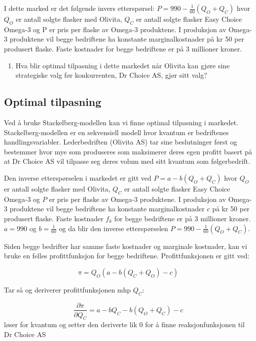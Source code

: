 \documentclass[
  12pt,
  a4paper,
  DIV=11,
  numbers=noendperiod]{scrartcl}
\providecommand{\tightlist}{%
  \setlength{\itemsep}{0pt}\setlength{\parskip}{0pt}}\usepackage{longtable,booktabs,array}
\begin{document}
I dette marked er det følgende invers etterspørsel:
\(P = 990−\frac{1}{60}(Q_O+Q_C)\) hvor \(Q_O\) er antall solgte flasker
med Olivita, \(Q_C\) er antall solgte flasker Easy Choice Omega-3 og P
er pris per flaske av Omega-3 produktene. I produksjon av Omega-3
produktene vil begge bedriftene ha konstante marginalkostnader på kr 50
per produsert flaske. Faste kostnader for begge bedriftene er på 3
millioner kroner.

\begin{enumerate}
\def\labelenumi{\alph{enumi})}
\tightlist
\item
  Hva blir optimal tilpasning i dette markedet når Olivita kan gjøre
  sine strategiske valg før konkurrenten, Dr Choice AS, gjør sitt valg?
\end{enumerate}

\subsection{Optimal tilpasning}\label{optimal-tilpasning}

Ved å bruke Stackelberg-modellen kan vi finne optimal tilpasning i
markedet. Stackelberg-modellen er en sekvensiell modell hvor kvantum er
bedriftenes handlingsvariabler. Lederbedriften (Olivita AS) tar sine
beslutninger først og bestemmer hvor mye som produseres som maksimerer
deres egen profitt basert på at Dr Choice AS vil tilpasse seg deres
volum med sitt kvantum som følgerbedrift.

Den inverse etterspørselen i markedet er gitt ved \(P = a−b(Q_O+Q_C)\)
hvor \(Q_O\) er antall solgte flasker med Olivita, \(Q_C\) er antall
solgte flasker Easy Choice Omega-3 og \(P\) er pris per flaske av
Omega-3 produktene. I produksjon av Omega-3 produktene vil begge
bedriftene ha konstante marginalkostnader \(c\) på kr 50 per produsert
flaske. Faste kostnader \(f_k\) for begge bedriftene er på 3 millioner
kroner. \(a = 990\) og \(b = \frac{1}{60}\) og da blir den inverse
etterspørselen \(P = 990−\frac{1}{60}(Q_O+Q_C)\).

Siden begge bedrifter har samme faste kostnader og marginale kostnader,
kan vi bruke en felles profittfunksjon for begge bedriftene.
Profittfunksjonen er gitt ved:

\[\pi = Q_O(a-b(Q_C+Q_O)-c) \tag{1}\]

Tar så og deriverer profittfunksjonen mhp \(Q_C\):

\[\frac{\partial \pi}{\partial Q_C} = a -b Q_C - b(Q_O+Q_C) -c \tag{2}\]
løser for kvantum og setter den deriverte lik 0 for å finne
reaksjonfunksjonen til Dr Choice AS
\end{document}
